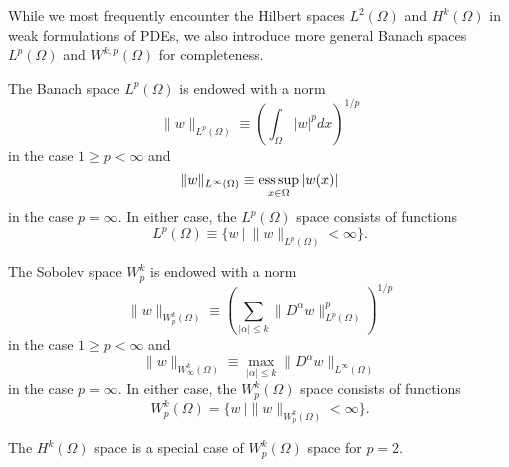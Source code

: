 While we most frequently encounter the Hilbert spaces $L^2(\Omega)$ and $H^k(\Omega)$ in weak formulations of PDEs, we also introduce more general Banach spaces $L^p(\Omega)$ and $W^{k,p}(\Omega)$ for completeness.
\begin{definition}
  The Banach space $L^p(\Omega)$ is endowed with a norm
  \begin{equation*}
    \| w \|_{L^p(\Omega)} \equiv \left(\int_\Omega |w|^p dx\right)^{1/p}
  \end{equation*}
  in the case $1 \geq p < \infty$ and
  \begin{equation*}
    \| w \|_{L^\infty(\Omega)} \equiv \operatorname*{ess\,sup}_{x \in \Omega} | w(x) | 
  \end{equation*}
  in the case $p = \infty$.   In either case, the $L^p(\Omega)$ space consists of functions
  \begin{equation*}
    L^p(\Omega) \equiv \{ w \ | \ \| w \|_{L^p(\Omega)} < \infty \}.
  \end{equation*}
\end{definition}
\begin{definition}[$W^k_p$ space]
  The Sobolev space $W^k_p$ is endowed with a norm
  \begin{equation*}
    \| w \|_{W^k_p(\Omega)} \equiv \left( \sum_{|\alpha|\leq k} \| D^\alpha w \|^p_{L^p(\Omega)} \right)^{1/p}
  \end{equation*}
  in the case $1 \geq p < \infty$ and
  \begin{equation*}
    \| w \|_{W^k_\infty(\Omega)} \equiv \max_{|\alpha| \leq k} \| D^\alpha w \|_{L^\infty(\Omega)}
  \end{equation*}
  in the case $p = \infty$. In either case, the $W^k_p(\Omega)$ space consists of functions
  \begin{equation*}
    W^k_p(\Omega) = \{ w \ | \| w \|_{W^k_p(\Omega)} < \infty \}.
  \end{equation*}
\end{definition}
\begin{remark}
  The $H^k(\Omega)$ space is a special case of $W^k_p(\Omega)$ space for $p = 2$.
\end{remark}




